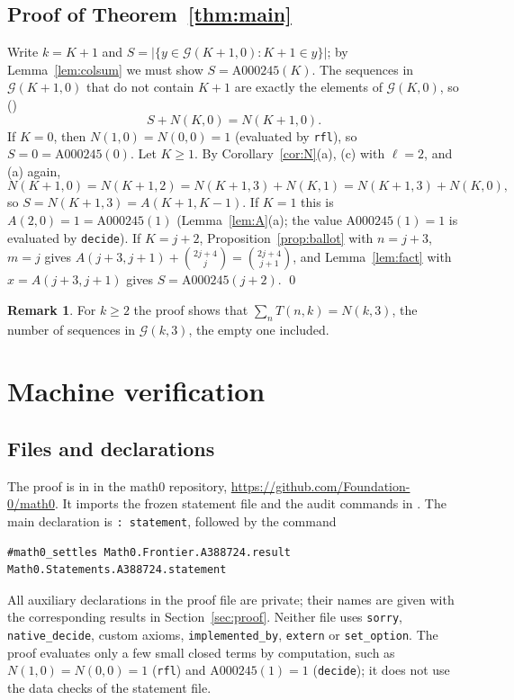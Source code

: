 \documentclass[11pt]{amsart}
\theoremstyle{plain}
\theoremstyle{definition}
\newtheorem{remark}[theorem]{Remark}
\newcommand{\G}{\mathcal{G}}
\begin{document}
\subsection{Proof of Theorem~\ref{thm:main}}
Write $k=K+1$ and $S=\bigl|\{y\in\G(K+1,0):K+1\in y\}\bigr|$; by Lemma~\ref{lem:colsum} we must show $S=\mathrm{A000245}(K)$. The sequences in $\G(K+1,0)$ that do not contain $K+1$ are exactly the elements of $\G(K,0)$, so ()
\[
  S+N(K,0)=N(K+1,0).
\]
If $K=0$, then $N(1,0)=N(0,0)=1$ (evaluated by \texttt{rfl}), so $S=0=\mathrm{A000245}(0)$. Let $K\ge1$. By Corollary~\ref{cor:N}(a), (c) with $\ell=2$, and (a) again,
\[
  N(K+1,0)=N(K+1,2)=N(K+1,3)+N(K,1)=N(K+1,3)+N(K,0),
\]
so $S=N(K+1,3)=A(K+1,K-1)$. If $K=1$ this is $A(2,0)=1=\mathrm{A000245}(1)$ (Lemma~\ref{lem:A}(a); the value $\mathrm{A000245}(1)=1$ is evaluated by \texttt{decide}). If $K=j+2$, Proposition~\ref{prop:ballot} with $n=j+3$, $m=j$ gives $A(j+3,j+1)+\binom{2j+4}{j}=\binom{2j+4}{j+1}$, and Lemma~\ref{lem:fact} with $x=A(j+3,j+1)$ gives $S=\mathrm{A000245}(j+2)$. \qed

\begin{remark}
For $k\ge2$ the proof shows that $\sum_nT(n,k)=N(k,3)$, the number of sequences in $\G(k,3)$, the empty one included.
\end{remark}

\section{Machine verification}\label{sec:lean}

\subsection*{Files and declarations}
The proof is in  in the math0 repository, \url{https://github.com/Foundation-0/math0}. It imports the frozen statement file  and the audit commands in . The main declaration is  \texttt{: statement}, followed by the command
\begin{lstlisting}
#math0_settles Math0.Frontier.A388724.result Math0.Statements.A388724.statement
\end{lstlisting}
All auxiliary declarations in the proof file are private; their names are given with the corresponding results in Section~\ref{sec:proof}. Neither file uses \texttt{sorry}, \texttt{native\_decide}, custom axioms, \texttt{implemented\_by}, \texttt{extern} or \texttt{set\_option}. The proof evaluates only a few small closed terms by computation, such as $N(1,0)=N(0,0)=1$ (\texttt{rfl}) and $\mathrm{A000245}(1)=1$ (\texttt{decide}); it does not use the data checks of the statement file.
\end{document}
